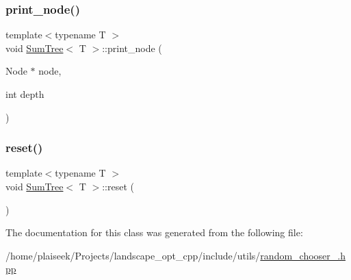 \subsubsection{\texorpdfstring{print\+\_\+node()}{print\_node()}}
{\footnotesize\ttfamily template$<$typename T $>$ \\
void \hyperlink{class_sum_tree}{Sum\+Tree}$<$ T $>$\+::print\+\_\+node (\begin{DoxyParamCaption}\item[{Node $\ast$}]{node,  }\item[{int}]{depth }\end{DoxyParamCaption})}

\mbox{\label{class_sum_tree_a8dd0f460c03f8545beca35a370b405db}} 
\subsubsection{\texorpdfstring{reset()}{reset()}}
{\footnotesize\ttfamily template$<$typename T $>$ \\
void \hyperlink{class_sum_tree}{Sum\+Tree}$<$ T $>$\+::reset (\begin{DoxyParamCaption}{ }\end{DoxyParamCaption})}



The documentation for this class was generated from the following file\+:\begin{DoxyCompactItemize}
\item 
/home/plaiseek/\+Projects/landscape\+\_\+opt\+\_\+cpp/include/utils/\hyperlink{random__chooser__2_8hpp}{random\+\_\+chooser\+\_.\+hpp}\end{DoxyCompactItemize}
